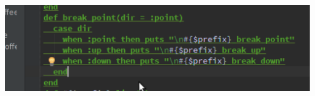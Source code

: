 \begin{frame}
	\ \\
	\begin{center}
		\includegraphics[scale=0.6]{scopes/preprocessor.pdf}
	\end{center}
\end{frame}

\begin{frame}
	\inputminted[linenos, frame=lines, label=rubyfunction]{java}{scopes/first.rb}
\end{frame}

